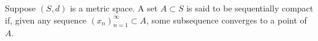 Suppose $(S, d)$ is a metric space. A set $A \subset S$ is said to be sequentially compact if, given any sequence $(x_n)_{n=1}^{\infty} \subset A$, some subsequence converges to a point of $A$.
